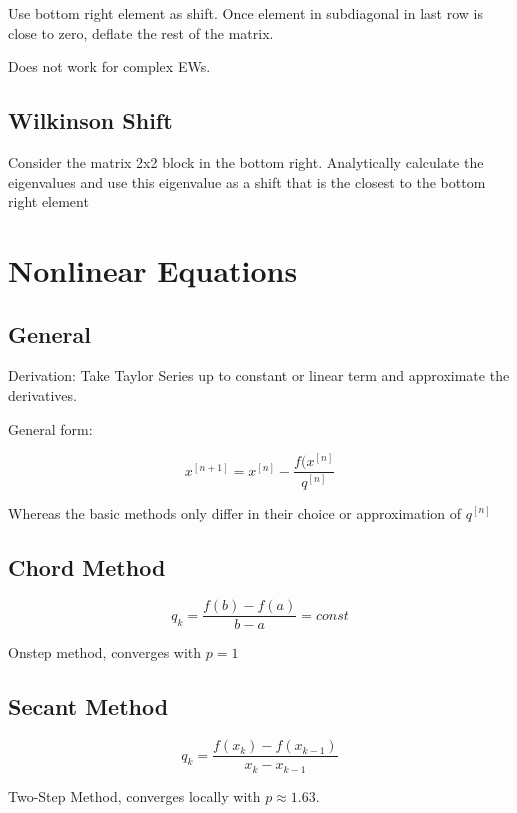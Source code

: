 \documentclass[
    a4paper,
    11pt
]{article}
\begin{document}
Use bottom right element as shift. Once element in subdiagonal in last row is
close to zero, deflate the rest of the matrix.

Does not work for complex EWs. 

\subsection{Wilkinson Shift}

Consider the matrix 2x2 block in the bottom right. Analytically calculate the
eigenvalues and use this eigenvalue as a shift that is the closest to the bottom
right element

\section{Nonlinear Equations}

\subsection{General}
Derivation: Take Taylor Series up to constant or linear term and approximate the
derivatives.

General form:

\begin{equation}
    x^{[n+1]} = x^{[n]} - \frac{f(x^{[n]}}{q^{[n]}}
\end{equation}

Whereas the basic methods only differ in their choice or approximation of
$q^{[n]}$

\subsection{Chord Method}

\begin{equation}
    q_k = \frac{f(b) - f(a)}{b - a} = const
\end{equation}

Onstep method, converges with $p=1$

\subsection{Secant Method}

\begin{equation}
    q_k = \frac{f(x_k) - f(x_{k-1})}{x_k - x_{k-1}}
\end{equation}

Two-Step Method, converges locally with $p \approx 1.63$.
\end{document}
